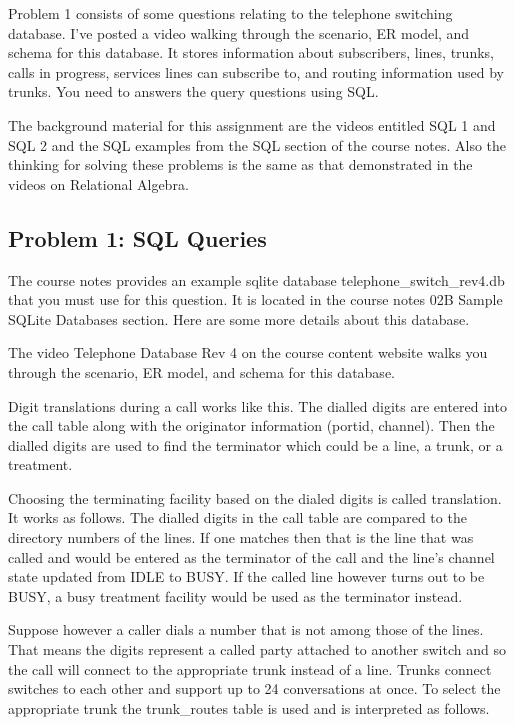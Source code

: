 \documentclass[12pt]{article}
\begin{document}
Problem 1 consists of some questions relating to the telephone switching database. I've posted a video walking through the scenario, ER model, and schema for this database. It stores information about subscribers, lines, trunks, calls in progress, services lines can subscribe to, and routing information used by trunks. You need to answers the query questions using SQL. \par

The background material for this assignment are the videos entitled SQL 1 and SQL 2 and the SQL examples from the SQL section of the course notes. Also the thinking for solving these problems is the same as that demonstrated in the videos on Relational Algebra.

\subsection{Problem 1: SQL Queries}
The course notes provides an example sqlite database telephone\_switch\_rev4.db that you must use for this question. It is located in the course notes 02B Sample SQLite Databases section. Here are some more details about this database. \par

The video Telephone Database Rev 4 on the course content website walks you through the scenario, ER model, and schema for this database. \par

Digit translations during a call works like this. The dialled digits are entered into the call table along with the originator information (portid, channel). Then the dialled digits are used to find the terminator which could be a line, a trunk, or a treatment. \par

Choosing the terminating facility based on the dialed digits is called translation. It works as follows. The dialled digits in the call table are compared to the directory numbers of the lines. If one matches then that is the line that was called and would be entered as the terminator of the call and the line's channel state updated from IDLE to BUSY. If the called line however turns out to be BUSY, a busy treatment facility would be used as the terminator instead. \par

Suppose however a caller dials a number that is not among those of the lines. That means the digits represent a called party attached to another switch and so the call will connect to the appropriate trunk instead of a line. Trunks connect switches to each other and support up to 24 conversations at once. To select the appropriate trunk the trunk\_routes table is used and is interpreted as follows. \par
\end{document}
